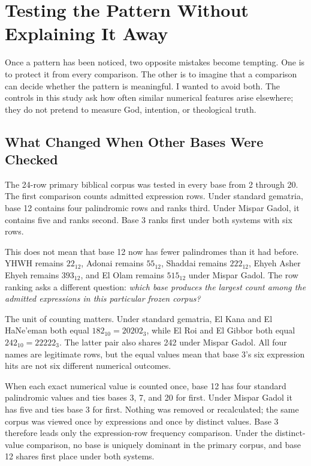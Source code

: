 \section{Testing the Pattern Without Explaining It Away}

Once a pattern has been noticed, two opposite mistakes become tempting. One is to protect it from every comparison. The other is to imagine that a comparison can decide whether the pattern is meaningful. I wanted to avoid both. The controls in this study ask how often similar numerical features arise elsewhere; they do not pretend to measure God, intention, or theological truth.

\subsection{What Changed When Other Bases Were Checked}

The 24-row primary biblical corpus was tested in every base from 2 through 20. The first comparison counts admitted expression rows. Under standard gematria, base 12 contains four palindromic rows and ranks third. Under Mispar Gadol, it contains five and ranks second. Base 3 ranks first under both systems with six rows.

This does not mean that base 12 now has fewer palindromes than it had before. YHWH remains $22_{12}$, Adonai remains $55_{12}$, Shaddai remains $222_{12}$, Ehyeh Asher Ehyeh remains $393_{12}$, and El Olam remains $515_{12}$ under Mispar Gadol. The row ranking asks a different question: \emph{which base produces the largest count among the admitted expressions in this particular frozen corpus?}

The unit of counting matters. Under standard gematria, El Kana and El HaNe'eman both equal $182_{10}=20202_3$, while El Roi and El Gibbor both equal $242_{10}=22222_3$. The latter pair also shares 242 under Mispar Gadol. All four names are legitimate rows, but the equal values mean that base 3's six expression hits are not six different numerical outcomes.

When each exact numerical value is counted once, base 12 has four standard palindromic values and ties bases 3, 7, and 20 for first. Under Mispar Gadol it has five and ties base 3 for first. Nothing was removed or recalculated; the same corpus was viewed once by expressions and once by distinct values. Base 3 therefore leads only the expression-row frequency comparison. Under the distinct-value comparison, no base is uniquely dominant in the primary corpus, and base 12 shares first place under both systems.

